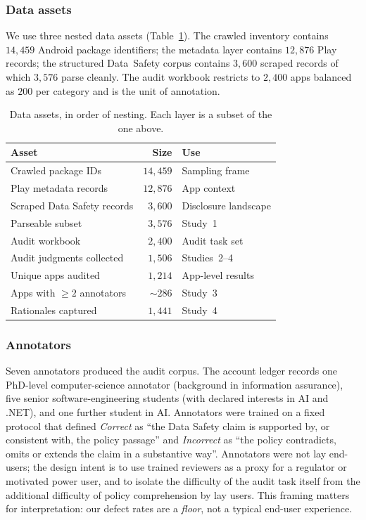 \documentclass[11pt,a4paper]{article}
\begin{document}
\subsubsection{Data assets}
We use three nested data assets (Table~\ref{tab:assets}).
The crawled inventory contains $14{,}459$ Android package identifiers; the
metadata layer contains $12{,}876$ Play records; the structured
Data~Safety corpus contains $3{,}600$ scraped records of which $3{,}576$
parse cleanly. The audit workbook restricts to $2{,}400$ apps balanced as
$200$ per category and is the unit of annotation.

\begin{table}[t]
\centering
\small
\caption{Data assets, in order of nesting. Each layer is a subset of the
one above.}
\label{tab:assets}
\begin{tabular}{lrl}
\toprule
Asset & Size & Use \\
\midrule
Crawled package IDs        & $14{,}459$ & Sampling frame \\
Play metadata records       & $12{,}876$ & App context \\
Scraped Data Safety records & $3{,}600$  & Disclosure landscape \\
Parseable subset            & $3{,}576$  & Study~1 \\
Audit workbook              & $2{,}400$  & Audit task set \\
Audit judgments collected   & $1{,}506$  & Studies~2--4 \\
Unique apps audited         & $1{,}214$  & App-level results \\
Apps with $\geq 2$ annotators & $\sim286$ & Study~3 \\
Rationales captured         & $1{,}441$  & Study~4 \\
\bottomrule
\end{tabular}
\end{table}

\subsubsection{Annotators}
Seven annotators produced the audit corpus. The account ledger records
one PhD-level computer-science annotator (background in information
assurance), five senior software-engineering students (with declared
interests in AI and .NET), and one further student in AI. Annotators
were trained on a fixed protocol that defined \emph{Correct} as ``the
Data Safety claim is supported by, or consistent with, the policy
passage'' and \emph{Incorrect} as ``the policy contradicts, omits or
extends the claim in a substantive way''. Annotators were not lay
end-users; the design intent is to use trained reviewers as a proxy for
a regulator or motivated power user, and to isolate the difficulty of the
audit task itself from the additional difficulty of policy comprehension
by lay users. This framing matters for interpretation: our defect rates
are a \emph{floor}, not a typical end-user experience.
\end{document}
